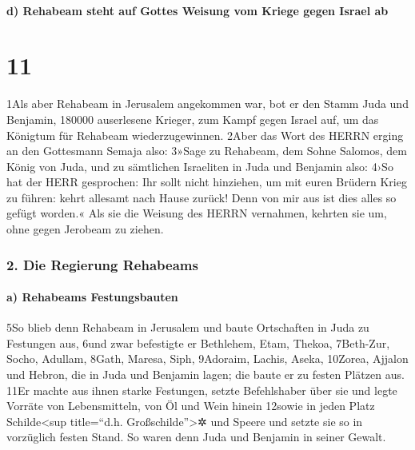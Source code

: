 \hypertarget{d-rehabeam-steht-auf-gottes-weisung-vom-kriege-gegen-israel-ab}{%
\paragraph{d) Rehabeam steht auf Gottes Weisung vom Kriege gegen Israel
ab}\label{d-rehabeam-steht-auf-gottes-weisung-vom-kriege-gegen-israel-ab}}

\hypertarget{section-10}{%
\section{11}\label{section-10}}

1Als aber Rehabeam in Jerusalem angekommen war, bot er den Stamm Juda
und Benjamin, 180000 auserlesene Krieger, zum Kampf gegen Israel auf, um
das Königtum für Rehabeam wiederzugewinnen. 2Aber das Wort des HERRN
erging an den Gottesmann Semaja also: 3»Sage zu Rehabeam, dem Sohne
Salomos, dem König von Juda, und zu sämtlichen Israeliten in Juda und
Benjamin also: 4›So hat der HERR gesprochen: Ihr sollt nicht hinziehen,
um mit euren Brüdern Krieg zu führen: kehrt allesamt nach Hause zurück!
Denn von mir aus ist dies alles so gefügt worden.« Als sie die Weisung
des HERRN vernahmen, kehrten sie um, ohne gegen Jerobeam zu ziehen.

\hypertarget{die-regierung-rehabeams}{%
\subsubsection{2. Die Regierung
Rehabeams}\label{die-regierung-rehabeams}}

\hypertarget{a-rehabeams-festungsbauten}{%
\paragraph{a) Rehabeams
Festungsbauten}\label{a-rehabeams-festungsbauten}}

5So blieb denn Rehabeam in Jerusalem und baute Ortschaften in Juda zu
Festungen aus, 6und zwar befestigte er Bethlehem, Etam, Thekoa,
7Beth-Zur, Socho, Adullam, 8Gath, Maresa, Siph, 9Adoraim, Lachis, Aseka,
10Zorea, Ajjalon und Hebron, die in Juda und Benjamin lagen; die baute
er zu festen Plätzen aus. 11Er machte aus ihnen starke Festungen, setzte
Befehlshaber über sie und legte Vorräte von Lebensmitteln, von Öl und
Wein hinein 12sowie in jeden Platz Schilde\textless sup title=``d.h.
Großschilde''\textgreater✲ und Speere und setzte sie so in vorzüglich
festen Stand. So waren denn Juda und Benjamin in seiner Gewalt.

